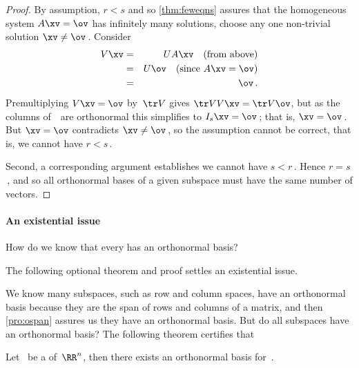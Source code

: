 \begin{proof}
By assumption, \(r<s\) and so \cref{thm:feweqns} assures that the homogeneous system \(A\xv=\ov\) has infinitely many solutions, choose any one non-trivial solution \(\xv\neq\ov\)\,.
Consider 
\begin{eqnarray*}
V\xv&=& UA\xv\quad(\text{from above})
\\&=&U\ov\quad(\text{since }A\xv=\ov)
\\&=&\ov\,.
\end{eqnarray*}
Premultiplying \(V\xv=\ov\) by~\(\tr V\) gives \(\tr VV\xv=\tr V\ov\), but as the columns of~\cV\ are orthonormal this simplifies to \(I_s\xv=\ov\)\,; that is, \(\xv=\ov\)\,.  
But \(\xv=\ov\) contradicts \(\xv\neq\ov\)\,, so the assumption cannot be correct, that is, we cannot have \(r<s\)\,.

Second, a corresponding argument establishes we cannot have \(s<r\)\,.
Hence \(r=s\)\,, and so all orthonormal bases of a given subspace must have the same number of vectors.
\end{proof}







\begin{comment}
Some books do not appear to establish that every subspace is a span of something.  The following argument is similar to Gramm--Schmidt, but not identical.  
\end{comment}

\paragraph{An existential issue} 
How do we know that every  has an orthonormal basis? 
\begin{aside}
The following optional theorem and proof settles an existential issue.
\end{aside}%
We know many subspaces, such as row and column spaces, have an orthonormal basis because they are the span of rows and columns of a matrix, and then \cref{pro:ospan} assures us they have an orthonormal basis.
But do all subspaces have an orthonormal basis?  
The following theorem certifies that 



\begin{theorem} \label{thm:obaseexists}
Let \WW\ be a  of~\(\RR^n\), then there exists an orthonormal basis for~\WW.
\end{theorem}

